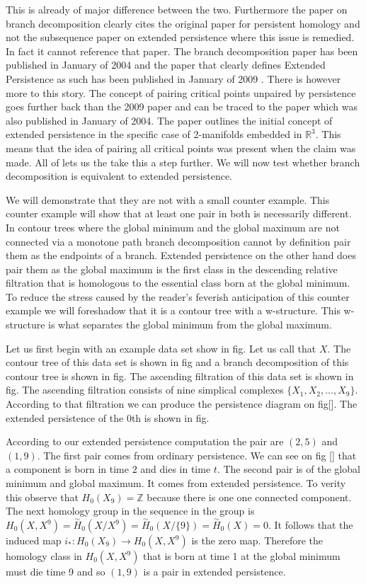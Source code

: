 This is already of major difference between the two. Furthermore the paper on branch decomposition clearly cites the original paper for persistent homology and not the subsequence paper on extended persistence where this issue is remedied. In fact it cannot reference that paper. The branch decomposition paper has been published in January of 2004 and the paper that clearly defines Extended Persistence as such has been published in January of 2009 \cite{persistence-extended}. There is however more to this story. The concept of pairing critical points unpaired by persistence goes further back than the 2009 paper and can be traced to the paper \cite{extreme-elevation} which was also published in January of 2004. The paper outlines the initial concept of extended persistence in the specific case of 2-manifolds embedded in $\mathbb{R}^3$. This means that the idea of pairing all critical points was present when the claim was made. All of lets us the take this a step further. We will now test whether branch decomposition is equivalent to extended persistence.

We will demonstrate that they are not with a small counter example. This counter example will show that at least one pair in both is necessarily different. In contour trees where the global minimum and the global maximum are not connected via a monotone path branch decomposition cannot by definition pair them as the endpoints of a branch. Extended persistence on the other hand does pair them as the global maximum is the first class in the descending relative filtration that is homologous to the essential class born at the global minimum. To reduce the stress caused by the reader's feverish anticipation of this counter example we will foreshadow that it is a contour tree with a w-structure. This w-structure is what separates the global minimum from the global maximum.

Let us first begin with an example data set show in fig. Let us call that $X$. The contour tree of this data set is shown in fig and a branch decomposition of this contour tree is shown in fig. The ascending filtration of this data set is shown in fig. The ascending filtration consists of nine simplical complexes $\{X_1, X_2, ..., X_9\}$. According to that filtration we can produce the persistence diagram on fig[]. The extended persistence of the 0th is shown in fig. 

According to our extended persistence computation the pair are $(2, 5)$ and $(1, 9)$. The first pair comes from ordinary persistence. We can see on fig [] that a component is born in time $2$ and dies in time $t$. The second pair is of the global minimum and global maximum. It comes from extended persistence. To verity this observe that $H_0(X_9) = \mathbb{Z}$ because there is one one connected component. The next homology group in the sequence in the group is $H_0(X, X^9) = \overset{\sim}{H}_0(X / X^9) = \overset{\sim}{H}_0(X / \{9\}) = \overset{\sim}{H}_0(X) = 0$. It follows that the induced map $i_* : H_0(X_9) \to H_0(X, X^9)$ is the zero map. Therefore the homology class in $H_0(X, X^9)$ that is born at time 1 at the global minimum must die time 9 and so $(1, 9)$ is a pair in extended persistence.

